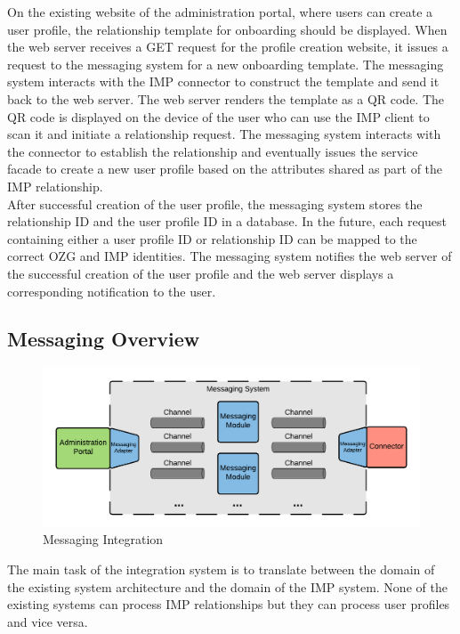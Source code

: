 On the existing website of the administration portal, where users can create a user profile, the relationship template for onboarding should be displayed. When the web server receives a GET request for the profile creation website, it issues a request to the messaging system for a new onboarding template. The messaging system interacts with the IMP connector to construct the template and send it back to the web server. The web server renders the template as a QR code. The QR code is displayed on the device of the user who can use the IMP client to scan it and initiate a relationship request. The messaging system interacts with the connector to establish the relationship and eventually issues the service facade to create a new user profile based on the attributes shared as part of the IMP relationship. \\
After successful creation of the user profile, the messaging system stores the relationship ID and the user profile ID in a database. In the future, each request containing either a user profile ID or relationship ID can be mapped to the correct OZG and IMP identities. The messaging system notifies the web server of the successful creation of the user profile and the web server displays a corresponding notification to the user.

\subsection{Messaging Overview}

\begin{figure}[h]
    \centering
    \includegraphics[scale=0.6]{Diagrams/Integration Architecture 1/Technological Integration/3. Messaging Integration.pdf}
    \caption{Messaging Integration}
    \label{integration1:messaging_integration}
\end{figure}

The main task of the integration system is to translate between the domain of the existing system architecture and the domain of the IMP system. None of the existing systems can process IMP relationships but they can process user profiles and vice versa. 

